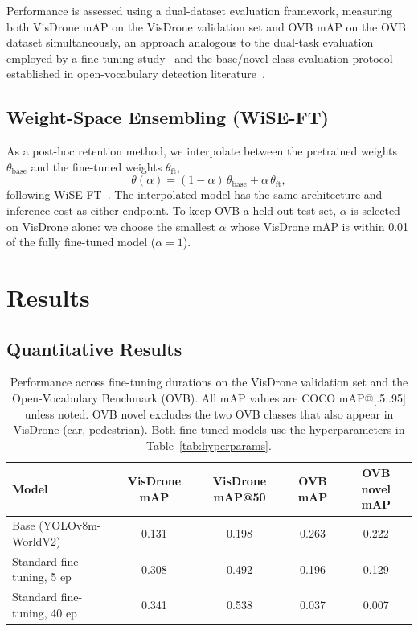 \documentclass[conf]{new-aiaa}
\begin{document}
Performance is assessed using a dual-dataset evaluation framework, measuring both VisDrone
mAP on the VisDrone validation set and OVB mAP on the OVB dataset simultaneously, an approach
analogous to the dual-task evaluation employed by a fine-tuning
study~\cite{gandhi2025finetuningforgettingadaptationyolov8} and the base/novel class
evaluation protocol established in open-vocabulary detection
literature~\cite{zareian2021ovrcnn}.


\subsection{Weight-Space Ensembling (WiSE-FT)}
\label{sec:wise}

As a post-hoc retention method, we interpolate between the pretrained weights
$\theta_{\text{base}}$ and the fine-tuned weights $\theta_{\text{ft}}$,
\begin{equation}
\theta(\alpha) = (1-\alpha)\,\theta_{\text{base}} + \alpha\,\theta_{\text{ft}},
\end{equation}
following WiSE-FT~\cite{wortsman2022robust}. The interpolated model has the same architecture
and inference cost as either endpoint. To keep OVB a held-out test set, $\alpha$ is selected on
VisDrone alone: we choose the smallest $\alpha$ whose VisDrone mAP is within 0.01 of the fully
fine-tuned model ($\alpha = 1$). 


\section{Results}

\subsection{Quantitative Results}
\begin{table}[hbt!]
\caption{Performance across fine-tuning durations on the VisDrone validation set and the
         Open-Vocabulary Benchmark (OVB). All mAP values are COCO mAP@[.5:.95] unless noted.
         OVB novel excludes the two OVB classes that also appear in VisDrone (car,
         pedestrian). Both fine-tuned models use the hyperparameters in
         Table~\ref{tab:hyperparams}.}
\label{tab:results}
\centering
\begin{tabular}{lcccc}
\hline
\textbf{Model} & \textbf{VisDrone mAP} & \textbf{VisDrone mAP@50}
& \textbf{OVB mAP} & \textbf{OVB novel mAP} \\
\hline
Base (YOLOv8m-WorldV2) & 0.131 & 0.198 & 0.263 & 0.222 \\
Standard fine-tuning, 5 ep  & 0.308 & 0.492 & 0.196 & 0.129 \\
Standard fine-tuning, 40 ep & 0.341 & 0.538 & 0.037 & 0.007 \\
\hline
\end{tabular}
\end{table}
\end{document}
